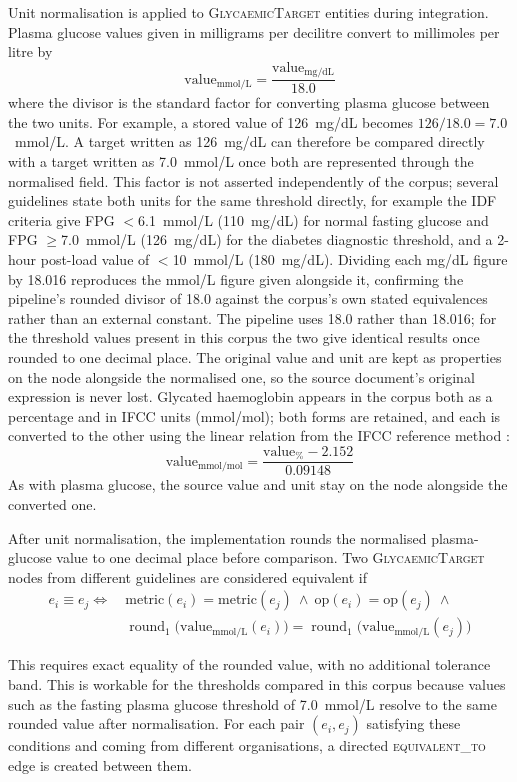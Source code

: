 Unit normalisation is applied to \textsc{GlycaemicTarget} entities during integration. Plasma glucose values given in milligrams per decilitre convert to millimoles per litre by
$$\text{value}_{\text{mmol/L}} = \frac{\text{value}_{\text{mg/dL}}}{18.0}$$
where the divisor is the standard factor for converting plasma glucose between the two units. For example, a stored value of 126~mg/dL becomes
$126/18.0 = 7.0$~mmol/L. A target written as 126~mg/dL can therefore be
compared directly with a target written as 7.0~mmol/L once both are
represented through the normalised field. This factor is not asserted independently of the corpus; several guidelines state both units for the same threshold directly, for example the IDF criteria \cite{IDF2025} give FPG $<$6.1~mmol/L (110~mg/dL) for normal fasting glucose and FPG $\geq$7.0~mmol/L (126~mg/dL) for the diabetes diagnostic threshold, and a 2-hour post-load value of $<$10~mmol/L (180~mg/dL). Dividing each mg/dL figure by 18.016 reproduces the mmol/L figure given alongside it, confirming the pipeline's rounded divisor of 18.0 against the corpus's own stated equivalences rather than an external constant. The pipeline uses 18.0 rather than 18.016; for the threshold values present in this corpus the two give identical results once rounded to one decimal place. The original value and unit are kept as properties on the node alongside the normalised one, so the source document's original expression is never lost. Glycated haemoglobin appears in the corpus both as a percentage and in IFCC units (mmol/mol); both forms are retained, and each is converted to the other using the linear relation from the IFCC reference method \cite{hoelzel2004}:
$$\text{value}_{\text{mmol/mol}} = \frac{\text{value}_{\%} - 2.152}{0.09148}$$
As with plasma glucose, the source value and unit stay on the node alongside the converted one.

After unit normalisation, the implementation rounds the normalised plasma-glucose value to one decimal place before comparison. Two \textsc{GlycaemicTarget} nodes from different guidelines are considered equivalent if
\begin{align*}
e_i \equiv e_j \iff\ &\text{metric}(e_i) = \text{metric}(e_j)\ \wedge\ 
\text{op}(e_i) = \text{op}(e_j)\ \wedge\ \\
&\operatorname{round}_1\bigl(\text{value}_{\text{mmol/L}}(e_i)\bigr) = \operatorname{round}_1\bigl(\text{value}_{\text{mmol/L}}(e_j)\bigr)
\end{align*}

This requires exact equality of the rounded value, with no additional tolerance band. This is workable for the thresholds compared in this corpus because
values such as the fasting plasma glucose threshold of 7.0~mmol/L
resolve to the same rounded value after normalisation. For each pair $(e_i, e_j)$ satisfying these conditions and coming from different organisations, a directed \textsc{equivalent\_to} edge is created between them.


